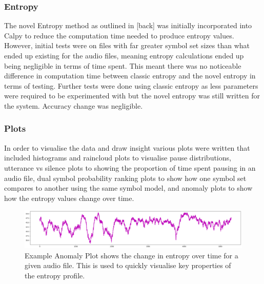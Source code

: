 \subsubsection{Entropy} 
The novel Entropy method as outlined in [back] was initially incorporated into Calpy to reduce the computation time needed to produce entropy values. However, initial tests were on files with far greater symbol set sizes than what ended up existing for the audio files, meaning entropy calculations ended up being negligible in terms of time spent. This meant there was no noticeable difference in computation time between classic entropy and the novel entropy in terms of testing. Further tests were done using classic entropy as less parameters were required to be experimented with but the novel entropy was still written for the system. Accuracy change was negligible. 

\subsubsection{Plots}
In order to visualise the data and draw insight various plots were written that included histograms and raincloud plots to visualise pause distributions, utterance vs silence plots to showing the proportion of time spent pausing in an audio file, dual symbol probability ranking plots to show how one symbol set compares to another using the same symbol model, and anomaly plots to show how the entropy values change over time.

\begin{figure}[h!]
	\center
	\includegraphics[scale=0.4]{src/main-matter/methodology/code-base/output/output_anomaly}
	\caption{Example Anomaly Plot shows the change in entropy over time for a given audio file. This is used to quickly visualise key properties of the entropy profile.}
	\label{fig:processing}
\end{figure}


